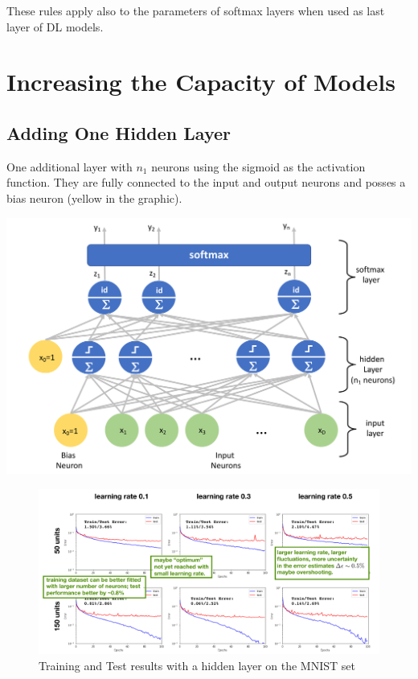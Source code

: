 \documentclass[11pt]{article}
\begin{document}
These rules apply also to the parameters of softmax layers when used as last layer of DL models.

\section{Increasing the Capacity of Models}

\subsection{Adding One Hidden Layer}
\begin{minipage}{0.5\linewidth}
	One additional layer with $n_1$ neurons using the sigmoid as the activation function. They are fully connected to the input and output neurons and posses a bias neuron (yellow in the graphic).
\end{minipage}
\begin{minipage}{0.5\linewidth}
	\centering
	\includegraphics[width=\linewidth]{img/hidden_layer_nn}
\end{minipage}

\begin{figure}[tbh]
	\centering
	\includegraphics[width=0.8\linewidth, keepaspectratio]{img/hidden_layer_mnist_test}
	\caption{Training and Test results with a hidden layer on the MNIST set}
	\label{fig:hiddenlayermnisttest}
\end{figure}
\end{document}
